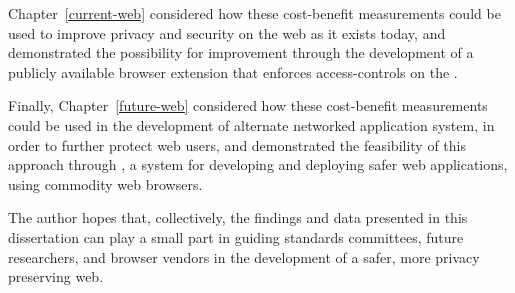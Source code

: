 Chapter~\ref{current-web} considered how these cost-benefit measurements could
be used to improve privacy and security on the web as it exists today, and
demonstrated the possibility for improvement through the development of a
publicly available browser extension that enforces access-controls on
the \WAPI.

Finally, Chapter~\ref{future-web} considered how these cost-benefit
measurements could be used in the development of alternate networked application
system, in order to further protect web users, and demonstrated the feasibility
of this approach through \CDF, a system for developing and deploying safer web
applications, using commodity web browsers.

The author hopes that, collectively, the findings and data presented in this
dissertation can play a small part in guiding standards committees, future
researchers, and browser vendors in the development of a safer, more privacy
preserving web.
